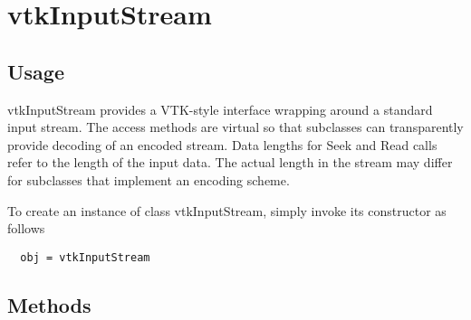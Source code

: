\section{vtkInputStream}

\subsection{Usage}

 vtkInputStream provides a VTK-style interface wrapping around a
 standard input stream.  The access methods are virtual so that
 subclasses can transparently provide decoding of an encoded stream.
 Data lengths for Seek and Read calls refer to the length of the
 input data.  The actual length in the stream may differ for
 subclasses that implement an encoding scheme.

To create an instance of class vtkInputStream, simply
invoke its constructor as follows
\begin{verbatim}
  obj = vtkInputStream
\end{verbatim}
\subsection{Methods}

